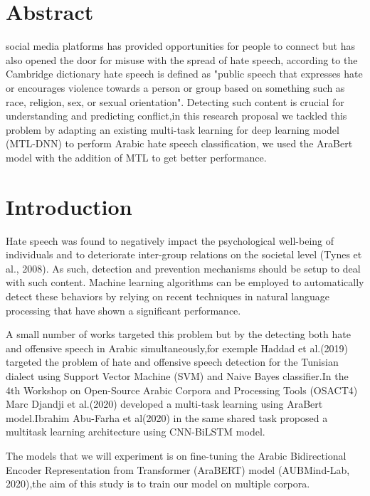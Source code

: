 \documentclass[paper=a4, fontsize=11pt]{scrartcl}
\numberwithin{equation}{section}		%
\numberwithin{figure}{section}			%
\numberwithin{table}{section}				%
\begin{document}
\section{Abstract}
social media platforms has provided opportunities for people to connect but has also opened the door for misuse with the spread of hate speech, according to the Cambridge dictionary hate speech is defined as "public speech that expresses hate or encourages violence towards a person or group based on something such as race, religion, sex, or sexual orientation". Detecting such content is crucial for understanding and predicting conflict,in this research proposal we tackled this problem by adapting an existing multi-task learning for deep learning model (MTL-DNN) to perform Arabic hate speech classification, we used the AraBert model with the addition of MTL to get better performance. 


\section{Introduction}
Hate speech was found to negatively impact the psychological well-being of individuals and to deteriorate inter-group relations on the societal level (Tynes et al., 2008)\cite{tynes2008online}. As such, detection and prevention mechanisms should be setup to deal with such content. Machine learning algorithms can be employed to automatically detect these behaviors by relying on recent techniques in natural language processing that have shown a significant performance.

A small number of works targeted this problem but by the detecting both hate and offensive speech in Arabic simultaneously,for exemple {Haddad et al.(2019)} targeted the problem of hate and offensive speech detection for the Tunisian dialect using Support Vector Machine (SVM) and Naive Bayes classifier.In the 4th Workshop on Open-Source Arabic Corpora and Processing Tools (OSACT4) {Marc Djandji et al.(2020)} developed a multi-task learning using AraBert model.{Ibrahim Abu-Farha et al(2020)} in the same shared task proposed a multitask learning architecture using CNN-BiLSTM model.

The models that we will experiment is on fine-tuning the Arabic Bidirectional Encoder Representation from Transformer (AraBERT) model (AUBMind-Lab, 2020),the aim of this study is to train our model on multiple corpora.
\end{document}
